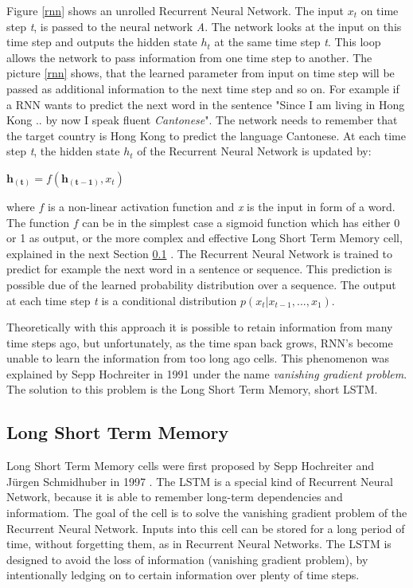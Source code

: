 Figure \ref{rnn} shows an unrolled Recurrent Neural Network. The input \(x_t\) on time step \textit{t}, is passed to the neural network \textit{A}. The network looks at the input on this time step and outputs the hidden state \(h_t\) at the same time step \textit{t}. This loop allows the network to pass information from one time step to another. The picture \ref{rnn} shows, that the learned parameter from input  on time step  will be passed as additional information to the next time step  and so on. For example if a RNN wants to predict the next word in the sentence "Since I am living in Hong Kong .. by now I speak fluent \textit{Cantonese}". The network needs to remember that the target country is Hong Kong to predict the language Cantonese. At each time step \textit{t}, the hidden state \textit{\(h_t\)} of the Recurrent Neural Network is updated by:

\begin{center}
\begin{math}
\boldsymbol{h_{(t)}} = f(\boldsymbol{h_{(t-1)}}, x_{t})
\end{math}
\end{center}

where \(f\) is a non-linear activation function and \textit{x} is the input in form of a word. The function \(f\) can be in the simplest case a sigmoid function which has either 0 or 1 as output, or the more complex and effective Long Short Term Memory cell, explained in the next Section \ref{ss:lstm} \cite{hochreiter1997long}. The Recurrent Neural Network is trained to predict for example the next word in a sentence or sequence. This prediction is possible due of the learned probability distribution over a sequence. The output at each time step \textit{t} is a conditional distribution \(p(x_{t}|x_{t-1},...,x_{1})\).

Theoretically with this approach it is possible to retain information from many time steps ago, but unfortunately, as the time span back grows, RNN's become unable to learn the information from too long ago cells. This phenomenon was explained by Sepp Hochreiter in 1991 \cite{Hochreiter:91} under the name \textit{vanishing gradient problem}. The solution to this problem is the Long Short Term Memory, short LSTM.

\subsection{Long Short Term Memory}\label{ss:lstm}
Long Short Term Memory cells were first proposed by Sepp Hochreiter and Jürgen Schmidhuber in 1997 \cite{hochreiter1997long}. The LSTM is a special kind of Recurrent Neural Network, because it is able to remember long-term dependencies and informatiom. The goal of the cell is to solve the vanishing gradient problem of the Recurrent Neural Network. Inputs into this cell can be stored for a long period of time, without forgetting them, as in Recurrent Neural Networks. The LSTM is designed to avoid the loss of information (vanishing gradient problem), by intentionally ledging on to certain information over plenty of time steps. 

